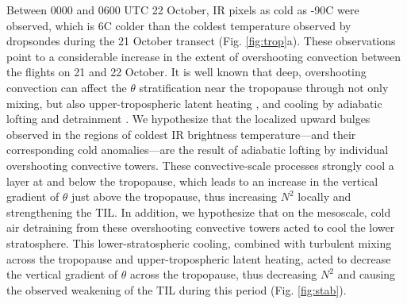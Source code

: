 Between 0000 and 0600 UTC 22 October, IR pixels as cold as -90\textdegree{}C were observed, which is 6\textdegree{}C colder than the coldest temperature observed by dropsondes during the 21 October transect (Fig. \ref{fig:trop}a).
These observations point to a considerable increase in the extent of overshooting convection between the flights on 21 and 22 October.
It is well known that deep, overshooting convection can affect the $\theta$ stratification near the tropopause through not only mixing, but also upper-tropospheric latent heating \citep{SalbyCallaghan2004}, and cooling by adiabatic lofting \citep{Sherwoodetal2003} and detrainment \citep{Salbyetal2003}.
We hypothesize that the localized upward bulges observed in the regions of coldest IR brightness temperature---and their corresponding cold anomalies---are the result of adiabatic lofting by individual overshooting convective towers.
These convective-scale processes strongly cool a layer at and below the tropopause, which leads to an increase in the vertical gradient of $\theta$ just above the tropopause, thus increasing $N^2$ locally and strengthening the TIL.
In addition, we hypothesize that on the mesoscale, cold air detraining from these
overshooting convective towers acted to cool the lower stratosphere.
This lower-stratospheric cooling, combined with turbulent mixing across the tropopause and upper-tropospheric latent heating, acted to decrease the vertical gradient of $\theta$ across the tropopause, thus decreasing $N^2$ and causing the observed weakening of the TIL during this period (Fig. \ref{fig:stab}).

